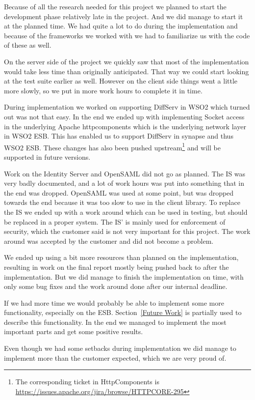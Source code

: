 
Because of all the research needed for this project we planned to start the development phase relatively late in the project. And we did manage to start it at the planned time. We had quite a lot to do during the implementation and because of the frameworks we worked with we had to familiarize us with the code of these as well. 

On the server side of the project we quickly saw that most of the implementation would take less time than originally anticipated. That way we could start looking at the test suite earlier as well. However on the client side things went a little more slowly, so we put in more work hours to complete it in time. 

During implementation we worked on supporting DiffServ in WSO2 which turned out was not that easy. In the end we ended up with implementing Socket access in the underlying Apache \Gls{httpcomponents} which is the underlying network layer in WSO2 ESB. This has enabled us to support DiffServ in \Gls{synapse} and thus WSO2 ESB. These changes has also been pushed upstream\footnote{The corresponding ticket in HttpComponents is \url{https://issues.apache.org/jira/browse/HTTPCORE-295}} and will be supported in future versions.

Work on the Identity Server and OpenSAML did not go as planned. The IS was very badly documented, and a lot of work hours was put into something that in the end was dropped. OpenSAML was used at some point, but was dropped towards the end because it was too slow to use in the client library. To replace the IS we ended up with a work around which can be used in testing, but should be replaced in a proper system. The IS' is mainly used for enforcement of security, which the customer said is not very important for this project. The work around was accepted by the customer and did not become a problem.

We ended up using a bit more resources than planned on the implementation, resulting in work on the final report mostly being pushed back to after the implementation. But we did manage to finish the implementation on time, with only some bug fixes and the work around done after our internal deadline.

If we had more time we would probably be able to implement some more functionality, especially on the ESB. Section~\ref{Future Work} is partially used to describe this functionality. In the end we managed to implement the most important parts and get some positive results.

Even though we had some setbacks during implementation we did manage to implement more than the customer expected, which we are very proud of.
